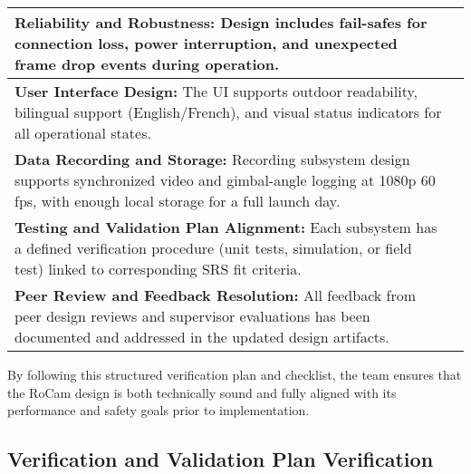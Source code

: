 \documentclass[12pt, titlepage]{article}
\begin{document}
\begin{table}[H]
\begin{tabular}{|p{10cm}|c|}
    \textbf{Reliability and Robustness:} Design includes fail-safes for
    connection loss, power interruption, and unexpected frame drop events
    during operation.                                       &                                       \\ \hline

    \textbf{User Interface Design:} The UI supports outdoor readability,
    bilingual support (English/French), and visual status indicators for
    all operational states.                                 &                                       \\ \hline

    \textbf{Data Recording and Storage:} Recording subsystem design
    supports synchronized video and gimbal-angle logging at 1080p 60 fps,
    with enough local storage for a full launch day.        &                                       \\ \hline

    \textbf{Testing and Validation Plan Alignment:} Each subsystem has
    a defined verification procedure (unit tests, simulation, or field test)
    linked to corresponding SRS fit criteria.               &                                       \\ \hline

    \textbf{Peer Review and Feedback Resolution:} All feedback from peer
    design reviews and supervisor evaluations has been documented and
    addressed in the updated design artifacts.              &                                       \\ \hline

  \end{tabular}
\end{table}

\noindent
By following this structured verification plan and checklist, the team
ensures that the RoCam design is both technically sound and fully aligned
with its performance and safety goals prior to implementation.




\subsection{Verification and Validation Plan Verification}

\end{document}
